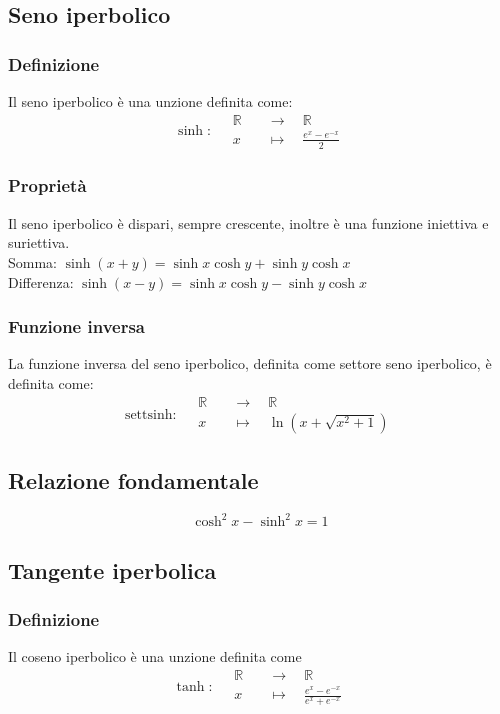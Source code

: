 \documentclass[a4paper]{article}
\newcommand\settsinh{\text{settsinh}}
\begin{document}
\subsection{Seno iperbolico}
\subsubsection*{Definizione}
Il seno iperbolico è una unzione definita come:
\[\sinh : \quad
\begin{aligned}
	\mathbb{R} \quad &\to \quad \mathbb{R} \\
	x \quad &\mapsto \quad \frac{e^x - e^{-x}}{2}
\end{aligned}
\]

\subsubsection*{Proprietà}
Il seno iperbolico è dispari, sempre crescente, inoltre è una funzione iniettiva e suriettiva. \\
Somma: \(\sinh \left( x + y \right) = \sinh x \cosh y + \sinh y \cosh x\) \\
Differenza: \(\sinh \left( x - y \right) = \sinh x \cosh y - \sinh y \cosh x\)

\subsubsection*{Funzione inversa}
La funzione inversa del seno iperbolico, definita come settore seno iperbolico, è definita come:
\[\settsinh : \quad
\begin{aligned}
	\mathbb{R} \quad &\to \quad \mathbb{R} \\
	x \quad &\mapsto \quad \ln \left( x + \sqrt{ x^2 + 1 } \right)
\end{aligned}
\]

\subsection{Relazione fondamentale}
\[\cosh^2 x - \sinh^2 x = 1\]

\subsection{Tangente iperbolica}
\subsubsection*{Definizione}
Il coseno iperbolico è una unzione definita come
\[\tanh : \quad
\begin{aligned}
	\mathbb{R} \quad &\to \quad \mathbb{R} \\
	x \quad &\mapsto \quad \frac{e^x - e^{-x}}{e^x + e^{-x}}
\end{aligned}	
\]
\end{document}
